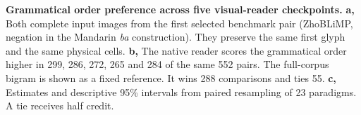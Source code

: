 \textbf{Grammatical order preference across five visual-reader checkpoints.}
\textbf{a,} Both complete input images from the first selected benchmark pair
(ZhoBLiMP, negation in the Mandarin \emph{ba} construction). They preserve the
same first glyph and the same physical cells. \textbf{b,} The native reader
scores the grammatical order higher in 299, 286, 272, 265 and 284 of the same
552 pairs. The full-corpus bigram is shown as a fixed reference. It wins
288 comparisons and ties 55. \textbf{c,} Estimates and descriptive 95\%
intervals from paired resampling of 23 paradigms. A tie receives half credit.
